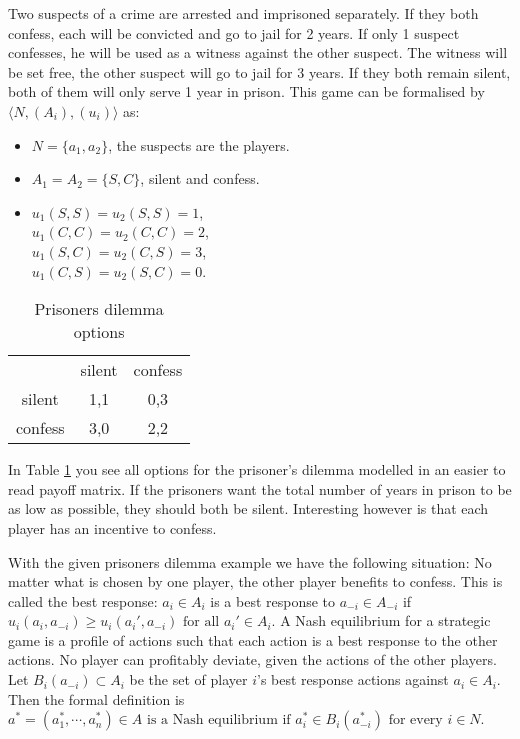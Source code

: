 Two suspects of a crime are arrested and imprisoned separately. If they both confess, each will be convicted and go to jail for 2 years. If only 1 suspect confesses, he will be used as a witness against the other suspect. The witness will be set free, the other suspect will go to jail for 3 years. If they both remain silent, both of them will only serve 1 year in prison. This game can be formalised by $\langle N, (A_i), (u_i) \rangle$ as:
\begin{itemize}
	\item $N = \{a_{1}, a_{2} \}$, the suspects are the players.
    \item $A_1 = A_2 = \{S, C\}$, silent and confess.
    \item $u_1(S, S) = u_2(S, S) = 1$, \\
    $u_1(C, C) = u_2(C, C) = 2$, \\
    $u_1(S, C) = u_2(C, S) = 3$, \\
    $u_1(C, S) = u_2(S, C) = 0$.

\end{itemize}

\begin{table}[h]
\centering
\begin{tabular}{ccc}
                             & silent                   & confess                   \\ \cline{2-3} 
\multicolumn{1}{c|}{silent}  & \multicolumn{1}{c|}{1,1} & \multicolumn{1}{c|}{0,3} \\ \cline{2-3} 
\multicolumn{1}{c|}{confess} & \multicolumn{1}{c|}{3,0} & \multicolumn{1}{c|}{2,2} \\ \cline{2-3} 
\end{tabular}
\caption{Prisoners dilemma options}
\label{prisoners-d}
\end{table}

In Table \ref{prisoners-d} you see all options for the prisoner's dilemma modelled in an easier to read payoff matrix. 
If the prisoners want the total number of years in prison to be as low as possible, they should both be silent. Interesting however is that each player has an incentive to confess. 

With the given prisoners dilemma example we have the following situation: No matter what is chosen by one player, the other player benefits to confess. This is called the best response: $a_i \in A_i $ is a best response to $ a_{-i} \in A_{-i} $ if $u_i(a_i, a_{-i}) \geq u_i(a_{i}', a_{-i}) \mbox{ for all } a_{i}' \in A_i$.
A Nash equilibrium for a strategic game is a profile of actions such
that each action is a best response to the other actions. No player can profitably deviate, given the actions of the other players. Let $B_i(a_{-i}) \subset A_i$ be the set of player $i$'s best response actions against $a_i \in A_i$. Then the formal definition is
$a^* = (a^*_1, \cdots, a^*_n) \in A \mbox{ is a Nash equilibrium if }
	a^*_i \in B_i(a_{-i}^*) \mbox{ for every } i \in N$.

